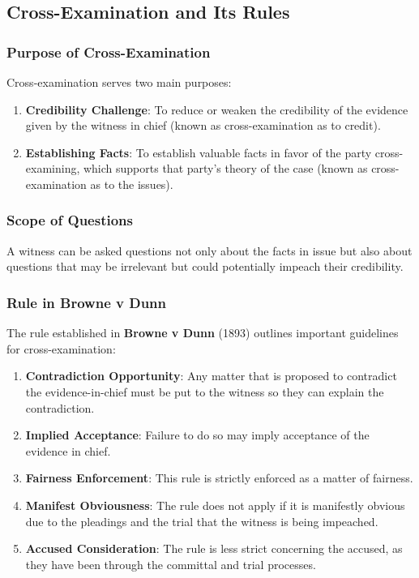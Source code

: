 \subsection{  Cross-Examination and Its
Rules}\label{cross-examination-and-its-rules}

\subsubsection{Purpose of
Cross-Examination}\label{purpose-of-cross-examination-1}

Cross-examination serves two main purposes:

\begin{enumerate}
\def\labelenumi{\arabic{enumi}.}
\tightlist
\item
  \textbf{Credibility Challenge}: To reduce or weaken the credibility of
  the evidence given by the witness in chief (known as cross-examination
  as to credit).
\item
  \textbf{Establishing Facts}: To establish valuable facts in favor of
  the party cross-examining, which supports that party's theory of the
  case (known as cross-examination as to the issues).
\end{enumerate}

\subsubsection{Scope of Questions}\label{scope-of-questions}

A witness can be asked questions not only about the facts in issue but
also about questions that may be irrelevant but could potentially
impeach their credibility.

\subsubsection{Rule in Browne v Dunn}\label{rule-in-browne-v-dunn}

The rule established in \textbf{Browne v Dunn} (1893) outlines important
guidelines for cross-examination:

\begin{enumerate}
\def\labelenumi{\arabic{enumi}.}
\tightlist
\item
  \textbf{Contradiction Opportunity}: Any matter that is proposed to
  contradict the evidence-in-chief must be put to the witness so they
  can explain the contradiction.
\item
  \textbf{Implied Acceptance}: Failure to do so may imply acceptance of
  the evidence in chief.
\item
  \textbf{Fairness Enforcement}: This rule is strictly enforced as a
  matter of fairness.
\item
  \textbf{Manifest Obviousness}: The rule does not apply if it is
  manifestly obvious due to the pleadings and the trial that the witness
  is being impeached.
\item
  \textbf{Accused Consideration}: The rule is less strict concerning the
  accused, as they have been through the committal and trial processes.
\end{enumerate}

